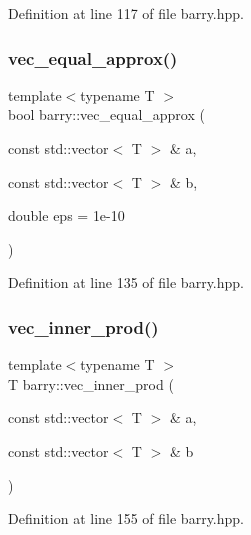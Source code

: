 Definition at line 117 of file barry.\+hpp.

\mbox{\label{namespacebarry_a24c4bd4a99dd82edf66c2d3b645dca08}} 
\subsubsection{\texorpdfstring{vec\+\_\+equal\+\_\+approx()}{vec\_equal\_approx()}}
{\footnotesize\ttfamily template$<$typename T $>$ \\
bool barry\+::vec\+\_\+equal\+\_\+approx (\begin{DoxyParamCaption}\item[{const std\+::vector$<$ T $>$ \&}]{a,  }\item[{const std\+::vector$<$ T $>$ \&}]{b,  }\item[{double}]{eps = {\ttfamily 1e-\/10} }\end{DoxyParamCaption})\hspace{0.3cm}{\ttfamily [inline]}}



Definition at line 135 of file barry.\+hpp.

\mbox{\label{namespacebarry_a0343fb4152724d5fa1ffa00d4b6182d9}} 
\subsubsection{\texorpdfstring{vec\+\_\+inner\+\_\+prod()}{vec\_inner\_prod()}}
{\footnotesize\ttfamily template$<$typename T $>$ \\
T barry\+::vec\+\_\+inner\+\_\+prod (\begin{DoxyParamCaption}\item[{const std\+::vector$<$ T $>$ \&}]{a,  }\item[{const std\+::vector$<$ T $>$ \&}]{b }\end{DoxyParamCaption})\hspace{0.3cm}{\ttfamily [inline]}}



Definition at line 155 of file barry.\+hpp.

